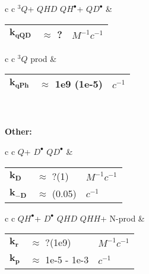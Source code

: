 \documentclass{article}
\def\QH{$QH^{\bullet }$}
\def\D{$D^{\bullet }$}
\def\Q{$Q$}
\def\Qt{$^{3}Q$}
\def\QHH{$QHH$}
\def\QHD{$QHD$}
\def\QD{$QD^{\bullet }$}
\begin{document}
\begin{tabular}{ c c }
    \schemestart
    \Qt + \QHD
    \arrow{->[$k_{qQD}$]}
    \QH + \QD
    \schemestop
     & \begin{tabular}{ l l l }
           $\mathbf{k_{qQD}}$ & $\approx$ ? & $M^{-1}c^{-1}$ \\\hline
       \end{tabular}
    \vspace{1.5mm}
\end{tabular}
\vspace{1.5mm}


\begin{tabular}{ c c }
    \schemestart
    \Qt
    \arrow{->[$k_{qPh}$]}
    prod
    \schemestop
     & \begin{tabular}{ l l l }
           $\mathbf{k_{qPh}}$ & $\approx$ 1e9 (1e-5) & $c^{-1}$ \\\hline
       \end{tabular}
    \vspace{1.5mm}
\end{tabular}
\vspace{1.5mm}
\\
\\
\textbf{Other:}

\begin{tabular}{ c c }
    \schemestart
    \Q + \D
    \arrow{<=>[$k_{D}$][$k_{-D}$]}
    \QD
    \schemestop
     & \begin{tabular}{ l l l }
           $\mathbf{k_{D}}$  & $\approx$ ?(1)   & $M^{-1}c^{-1}$ \\
           $\mathbf{k_{-D}}$ & $\approx$ (0.05) & $c^{-1}$       \\\hline
       \end{tabular}
    \vspace{1.5mm}
\end{tabular}
\vspace{1.5mm}


\begin{tabular}{ c c }
    \schemestart
    \QH + \D
    \arrow{->[$k_{r}$]}
    \QHD
    \arrow{->[$k_{p}$]}
    \QHH + N-prod
    \schemestop
     & \begin{tabular}{ l l l }
           $\mathbf{k_{r}}$ & $\approx$ ?(1e9)      & $M^{-1}c^{-1}$ \\
           $\mathbf{k_{p}}$ & $\approx$ 1e-5 - 1e-3 & $c^{-1}$       \\\hline
       \end{tabular}
    \vspace{1.5mm}
\end{tabular}
\vspace{1.5mm}
\end{document}
